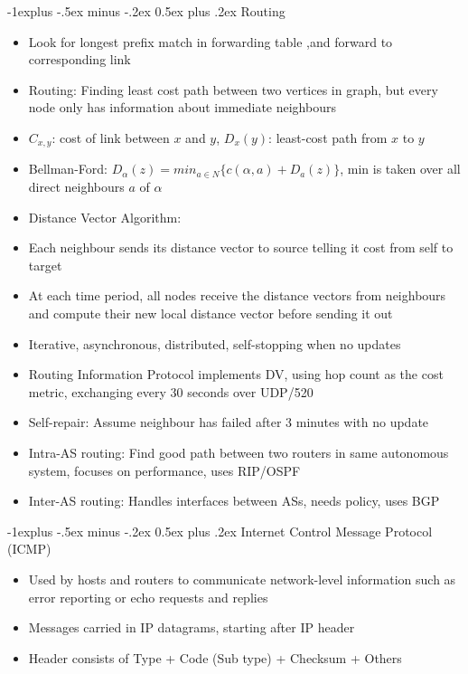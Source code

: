 \documentclass[10pt, landscape]{article}
\makeatletter
\renewcommand{\section}{\@startsection{section}{1}{0mm}%
                                {-1ex plus -.5ex minus -.2ex}%
                                {0.5ex plus .2ex}%
                                {\normalfont\large\bfseries}}
\renewcommand{\section}{\@startsection{section}{2}{0mm}%
                                {-1explus -.5ex minus -.2ex}%
                                {0.5ex plus .2ex}%
                                {\normalfont\normalsize\bfseries}}
\makeatother
\begin{document}
\begin{multicols*}{3}
\section{Routing}
\begin{itemize}
    \item Look for longest prefix match in forwarding table ,and forward to corresponding link
    \item Routing: Finding least cost path between two vertices in graph, but every node only has information about immediate neighbours
    \item $C_{x, y}$: cost of link between $x$ and $y$, $D_x(y)$: least-cost path from $x$ to $y$
    \item Bellman-Ford: $D_\alpha(z)=min_{a\in N}\{c(\alpha, a)+D_a(z)\}$, min is taken over all direct neighbours $a$ of $\alpha$
    \item Distance Vector Algorithm:
    \item Each neighbour sends its distance vector to source telling it cost from self to target
    \item At each time period, all nodes receive the distance vectors from neighbours and compute their new local distance vector before sending it out
    \item Iterative, asynchronous, distributed, self-stopping when no updates
    \item Routing Information Protocol implements DV, using hop count as the cost metric, exchanging every 30 seconds over UDP/520
    \item Self-repair: Assume neighbour has failed after 3 minutes with no update
    \item Intra-AS routing: Find good path between two routers in same autonomous system, focuses on performance, uses RIP/OSPF
    \item Inter-AS routing: Handles interfaces between ASs, needs policy, uses BGP
\end{itemize}

\section{Internet Control Message Protocol (ICMP)}
\begin{itemize}
    \item Used by hosts and routers to communicate network-level information such as error reporting or echo requests and replies
    \item Messages carried in IP datagrams, starting after IP header
    \item Header consists of Type + Code (Sub type) + Checksum + Others
\end{itemize}


\end{multicols*}
\end{document}

